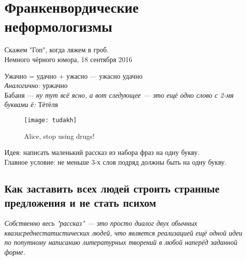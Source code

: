 \section{Франкенвордические неформологизмы}
\begin{epigraph}
        Скажем "Гоп", когда ляжем в гроб.\\
        Немного чёрного юмора, 18 сентября 2016 %
\end{epigraph}
Ужачно = удачно + ужасно --- ужасно удачно\\

\emph{Аналогично:} уржачно\\

Бабаня --- \emph{ну тут всё ясно, а вот следующее --- это ещё одно слово с 2-мя буквами ё:} Тётёля

\begin{figure}[ht!]
    \centering
    \texttt{[image: tudakh]}
    \caption{Alice, stop using drugs!}
\end{figure}

Идея: написать маленький рассказ из набора фраз на одну букву.\\
Главное условие: не меньше 3-х слов подряд должны быть на одну букву.

\subsection{Как заставить всех людей строить странные предложения и не стать психом}
\emph{Собственно весь "рассказ" --- это просто диалог двух обычных квазисреднестатистических людей, что является реализацией ещё одной идеи по попутному написанию литературных творений в любой наперёд заданной форме.}

